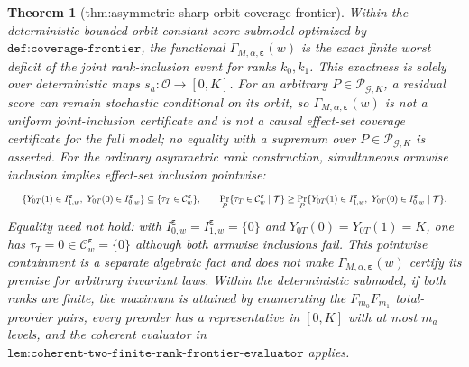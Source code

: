 \documentclass{article}
\newtheorem{theorem}{Theorem}
\begin{document}
\begin{theorem}[thm:asymmetric-sharp-orbit-coverage-frontier]\label{thm:asymmetric-sharp-orbit-coverage-frontier}
Within the deterministic bounded orbit-constant-score submodel optimized by \(\texttt{def:coverage-frontier}\), the functional \(\Gamma_{M,\alpha,\boldsymbol\varepsilon}(w)\) is the exact finite worst deficit of the joint rank-inclusion event for ranks \(k_0,k_1\). This exactness is solely over deterministic maps \(s_a:\mathcal O\to[0,K]\). For an arbitrary \(P\in\mathcal P_{\mathcal G,K}\), a residual score can remain stochastic conditional on its orbit, so \(\Gamma_{M,\alpha,\boldsymbol\varepsilon}(w)\) is not a uniform joint-inclusion certificate and is not a causal effect-set coverage certificate for the full model; no equality with a supremum over \(P\in\mathcal P_{\mathcal G,K}\) is asserted. For the ordinary asymmetric rank construction, simultaneous armwise inclusion implies effect-set inclusion pointwise:
\[
\makebox[\linewidth][c]{\resizebox{0.98\linewidth}{!}{\(\displaystyle \{Y_{0T}(1)\in I^{\boldsymbol\varepsilon}_{1,w},\ Y_{0T}(0)\in I^{\boldsymbol\varepsilon}_{0,w}\}
\subseteq
\{\tau_T\in\mathcal C^{\boldsymbol\varepsilon}_w\},
\qquad
\Pr_P\{\tau_T\in\mathcal C^{\boldsymbol\varepsilon}_w\mid\mathcal T\}
\ge
\Pr_P\{Y_{0T}(1)\in I^{\boldsymbol\varepsilon}_{1,w},\ Y_{0T}(0)\in I^{\boldsymbol\varepsilon}_{0,w}\mid\mathcal T\}.\)}}
\]
Equality need not hold: with \(I^{\boldsymbol\varepsilon}_{0,w}=I^{\boldsymbol\varepsilon}_{1,w}=\{0\}\) and \(Y_{0T}(0)=Y_{0T}(1)=K\), one has \(\tau_T=0\in\mathcal C^{\boldsymbol\varepsilon}_w=\{0\}\) although both armwise inclusions fail. This pointwise containment is a separate algebraic fact and does not make \(\Gamma_{M,\alpha,\boldsymbol\varepsilon}(w)\) certify its premise for arbitrary invariant laws. Within the deterministic submodel, if both ranks are finite, the maximum is attained by enumerating the \(F_{m_0}F_{m_1}\) total-preorder pairs, every preorder has a representative in \([0,K]\) with at most \(m_a\) levels, and the coherent evaluator in \(\texttt{lem:coherent-two-finite-rank-frontier-evaluator}\) applies.


\end{theorem}
\end{document}
